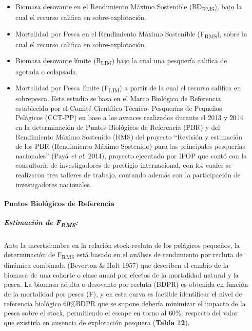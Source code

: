 \documentclass[
  spanish,
]{article}
\providecommand{\tightlist}{%
  \setlength{\itemsep}{0pt}\setlength{\parskip}{0pt}}
\begin{document}
\begin{itemize}
\tightlist
\item
  Biomasa desovante en el Rendimiento Máximo Sostenible
  (BD\textsubscript{RMS}), bajo la cual el recurso califica en
  sobre-explotación.
\item
  Mortalidad por Pesca en el Rendimiento Máximo Sostenible
  (F\textsubscript{RMS}), sobre la cual el recurso califica en
  sobre-explotación.
\item
  Biomasa desovante límite (B\textsubscript{LIM}) bajo la cual una
  pesquería califica de agotada o colapsada.
\item
  Mortalidad por Pesca límite (F\textsubscript{LIM}) a partir de la cual
  el recurso califica en sobrepesca. Este estudio se basa en el Marco
  Biológico de Referencia establecido por el Comité Científico Técnico-
  Pesquerías de Pequeños Pelágicos (CCT-PP) en base a los avances
  realizados durante el 2013 y 2014 en la determinación de Puntos
  Biológicos de Referencia (PBR) y del Rendimiento Máximo Sostenido
  (RMS) del proyecto ``Revisión y estimación de los PBR (Rendimiento
  Máximo Sostenido) para las principales pesquerías nacionales'' (Payá
  \emph{et al}. 2014), proyecto ejecutado por IFOP que contó con la
  consultoría de investigadores de prestigio internacional, con los
  cuales se realizaron tres talleres de trabajo, contando además con la
  participación de investigadores nacionales.
\end{itemize}

\hypertarget{puntos-bioluxf3gicos-de-referencia}{%
\paragraph{Puntos Biológicos de
Referencia}\label{puntos-bioluxf3gicos-de-referencia}}

\hypertarget{estimaciuxf3n-de-frms}{%
\subparagraph{\texorpdfstring{Estimación de
F\textsubscript{RMS}:}{Estimación de FRMS:}}\label{estimaciuxf3n-de-frms}}

Ante la incertidumbre en la relación stock-recluta de los pelágicos
pequeños, la determinación de F\textsubscript{RMS} está basado en el
análisis de rendimiento por recluta de dinámica combinada (Beverton \&
Holt 1957) que describen el cambio de la biomasa de una cohorte o clase
anual por efectos de la mortalidad natural y la pesca. La biomasa adulta
o desovante por recluta (BDPR) es obtenida en función de la mortalidad
por pesca (F), y en esta curva es factible identificar el nivel de
referencia biológico 60\%BDPR que se supone debería minimizar el impacto
de la pesca sobre el stock, permitiendo el escape en torno al 60\%,
respecto del valor que existiría en ausencia de explotación pesquera
(\textbf{Tabla 12}).
\end{document}
